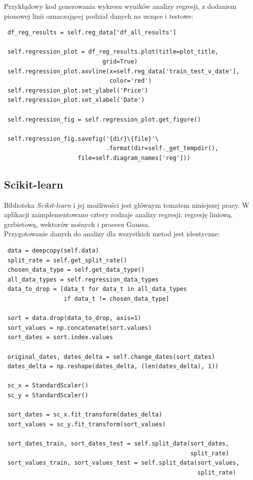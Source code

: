 Przykłądowy kod generowania wykresu wyników analizy regresji, z dodaniem pionowej linii oznaczającej podział danych na uczące i testowe:
\begin{lstlisting}
 df_reg_results = self.reg_data['df_all_results']
 
 self.regression_plot = df_reg_results.plot(title=plot_title,
				            grid=True)
 self.regression_plot.axvline(x=self.reg_data['train_test_v_date'],
                              color='red')
 self.regression_plot.set_ylabel('Price')
 self.regression_plot.set_xlabel('Date')
 
 self.regression_fig = self.regression_plot.get_figure()
 
 self.regression_fig.savefig('{dir}\{file}'\
                             .format(dir=self._get_tempdir(),
				     file=self.diagram_names['reg']))
\end{lstlisting}

\subsection{Scikit-learn}
Biblioteka \textit{Scikit-learn} i jej możliwości jest głównym tematem niniejszej pracy. W aplikacji zaimplementowano cztery rodzaje analizy regresji: regresję liniową, grzbietową, wektorów nośnych i procesu Gaussa.\\

Przygotowanie danych do analizy dla wszystkich metod jest identyczne:
\begin{lstlisting}
 data = deepcopy(self.data)
 split_rate = self.get_split_rate()
 chosen_data_type = self.get_data_type()
 all_data_types = self.regression_data_types
 data_to_drop = [data_t for data_t in all_data_types
                 if data_t != chosen_data_type]

 sort = data.drop(data_to_drop, axis=1)
 sort_values = np.concatenate(sort.values)
 sort_dates = sort.index.values

 original_dates, dates_delta = self.change_dates(sort_dates)
 dates_delta = np.reshape(dates_delta, (len(dates_delta), 1))

 sc_x = StandardScaler()
 sc_y = StandardScaler()

 sort_dates = sc_x.fit_transform(dates_delta)
 sort_values = sc_y.fit_transform(sort_values)

 sort_dates_train, sort_dates_test = self.split_data(sort_dates,
                                                     split_rate)
 sort_values_train, sort_values_test = self.split_data(sort_values,
                                                       split_rate)
\end{lstlisting}

